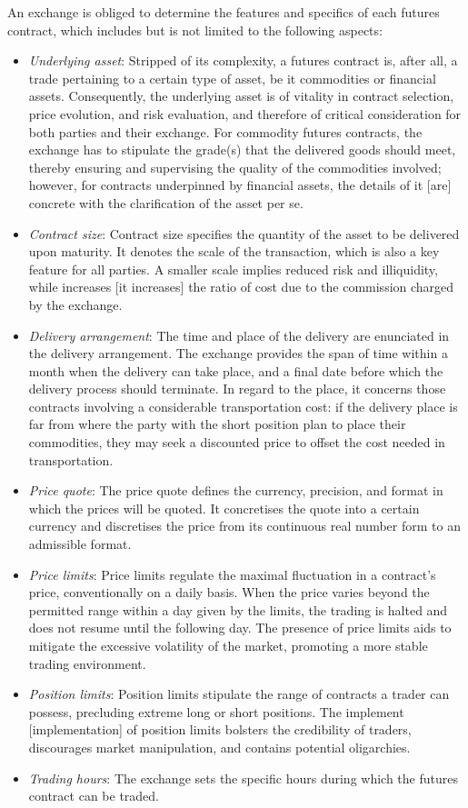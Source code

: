 \documentclass[11pt,twoside]{article}
\numberwithin{Theorem}{section}
\numberwithin{Definition}{section}
\numberwithin{Lemma}{section}
\numberwithin{Algorithm}{section}
\numberwithin{equation}{section}
\begin{document}
An exchange is obliged to determine the features and specifics of each futures contract, which includes but is not limited to the following aspects:
\begin{itemize}
\item \emph{Underlying asset}: Stripped of its complexity, a futures contract is, after all, a trade pertaining to a certain type of asset, be it commodities or financial assets. Consequently, the underlying asset is of vitality in contract selection, price evolution, and risk evaluation, and therefore of critical consideration for both parties and their exchange. For commodity futures contracts, the exchange has to stipulate the grade(s) that the delivered goods should meet, thereby ensuring and supervising the quality of the commodities involved; however, for contracts underpinned by financial assets, the details of it [are] concrete with the clarification of the asset per se.
\item \emph{Contract size}: Contract size specifies the quantity of the asset to be delivered upon maturity. It denotes the scale of the transaction, which is also a key feature for all parties. A smaller scale implies reduced risk and illiquidity, while increases [it increases] the ratio of cost due to the commission charged by the exchange.
\item \emph{Delivery arrangement}: The time and place of the delivery are enunciated in the delivery arrangement. The exchange provides the span of time within a month when the delivery can take place, and a final date before which the delivery process should terminate. In regard to the place, it concerns those contracts involving a considerable transportation cost: if the delivery place is far from where the party with the short position plan to place their commodities, they may seek a discounted price to offset the cost needed in transportation.
\item \emph{Price quote}: The price quote defines the currency, precision, and format in which the prices will be quoted. It concretises the quote into a certain currency and discretises the price from its continuous real number form to an admissible format.
\item \emph{Price limits}: Price limits regulate the maximal fluctuation in a contract's price, conventionally on a daily basis. When the price varies beyond the permitted range within a day given by the limits, the trading is halted and does not resume until the following day. The presence of price limits aids to mitigate the excessive volatility of the market, promoting a more stable trading environment.
\item \emph{Position limits}: Position limits stipulate the range of contracts a trader can possess, precluding extreme long or short positions. The implement [implementation] of position limits bolsters the credibility of traders, discourages market manipulation, and contains potential oligarchies.
\item \emph{Trading hours}: The exchange sets the specific hours during which the futures contract can be traded.
\end{itemize}
\end{document}
